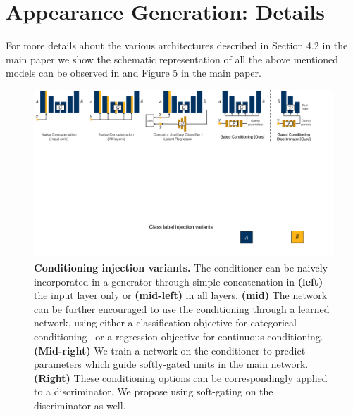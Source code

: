 \section{Appearance Generation: Details}
For more details about the various architectures described in Section 4.2 in the main paper we show the schematic representation of all the above mentioned models can be observed in  and Figure 5 in the main paper.

\begin{figure}[t]
    \centering
    \includegraphics[width=\linewidth]{paper_images/arch_inject2.pdf}
    \caption{{\bf Conditioning injection variants.}
    The conditioner can be naively incorporated in a generator through simple concatenation in {\bf (left)} the input layer only or {\bf (mid-left)} in all layers. {\bf (mid)} The network can be further encouraged to use the conditioning through a learned network, using either a classification objective for categorical conditioning~\cite{odena2016conditional,chen2016infogan} or a regression objective for continuous conditioning. {\bf (Mid-right)} We train a network on the conditioner to predict parameters which guide softly-gated units in the main network. {\bf (Right)} These conditioning options can be correspondingly applied to a discriminator. We propose using soft-gating on the discriminator as well.\label{fig:arch-inj}
    \vspace{-2mm}
    }
    \vspace{-2mm}
\end{figure}
